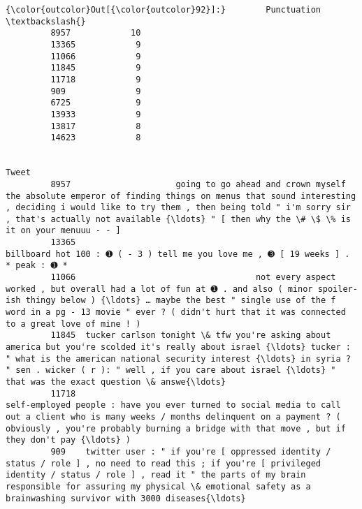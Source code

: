 \documentclass[11pt]{article}
\begin{document}
\begin{Verbatim}[commandchars=\\\{\}]
{\color{outcolor}Out[{\color{outcolor}92}]:}        Punctuation  \textbackslash{}
         8957            10   
         13365            9   
         11066            9   
         11845            9   
         11718            9   
         909              9   
         6725             9   
         13933            9   
         13817            8   
         14623            8   
         
                                                                                                                                                                                                                                                                                                  Tweet  
         8957                     going to go ahead and crown myself the absolute emperor of finding things on menus that sound interesting , deciding i would like to try them , then being told " i'm sorry sir , that's actually not available {\ldots} " [ then why the \# \$ \% is it on your menuuu - - ]  
         13365                                                                                                                                                                                                        billboard hot 100 : ➊ ( - 3 ) tell me you love me , ➌ [ 19 weeks ] . * peak : ➊ *  
         11066                                    not every aspect worked , but overall had a lot of fun at ➊ . and also ( minor spoiler-ish thingy below ) {\ldots} … maybe the best " single use of the f word in a pg - 13 movie " ever ? ( didn't hurt that it was connected to a great love of mine ! )  
         11845  tucker carlson tonight \& tfw you're asking about america but you're scolded it's really about israel {\ldots} tucker : " what is the american national security interest {\ldots} in syria ? " sen . wicker ( r ): " well , if you care about israel {\ldots} " that was the exact question \& answe{\ldots}  
         11718                                                        self-employed people : have you ever turned to social media to call out a client who is many weeks / months delinquent on a payment ? ( obviously , you're probably burning a bridge with that move , but if they don't pay {\ldots} )  
         909    twitter user : " if you're [ oppressed identity / status / role ] , no need to read this ; if you're [ privileged identity / status / role ] , read it " the parts of my brain responsible for assuring my physical \& emotional safety as a brainwashing survivor with 3000 diseases{\ldots}  

\end{Verbatim}
\end{document}

